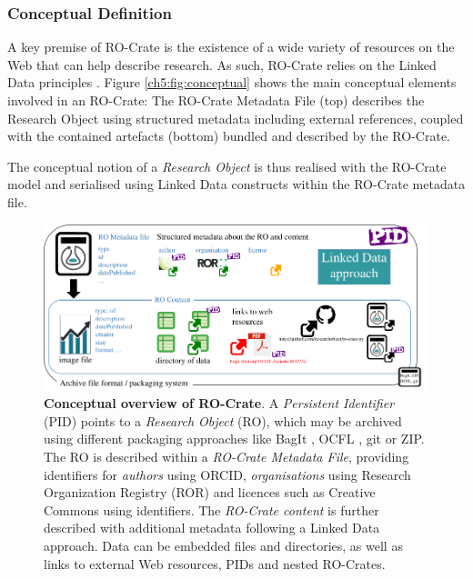 \subsubsection{Conceptual Definition}\label{ch5:conceptual}

A key premise of RO-Crate is the existence of a wide variety of
resources on the Web that can help describe research. As such, RO-Crate
relies on the Linked Data principles
\cite{Heath 2011}.
Figure \vref{ch5:fig:conceptual} shows the main conceptual
elements involved in an RO-Crate: The RO-Crate Metadata File (top)
describes the Research Object using structured metadata including
external references, coupled with the contained artefacts (bottom)
bundled and described by the RO-Crate.

The conceptual notion of a \emph{Research Object}
\cite{Bechhofer 2013}
is thus realised with the RO-Crate model and serialised using Linked
Data constructs within the RO-Crate metadata file.


\begin{figure}%
  \includegraphics[width=\textwidth]{figures/ch05/ro-crate-overview.pdf}
	\caption[Conceptual overview of RO-Crate]{\textbf{Conceptual overview of RO-Crate}. A \emph{Persistent
  Identifier} (\acrshort{PID}) \cite{McMurry 2017} points to a
  \emph{Research Object} (RO), which may be archived using different
  packaging approaches like BagIt \cite{Kunze 2018}, OCFL \cite
  {OCFL 2020}, git or \gls{ZIP}. The RO is described within a \emph{RO-Crate
  Metadata File}, providing identifiers for \emph{authors} using ORCID,
  \emph{organisations} using Research Organization Registry (ROR) 
  \cite{Lammey 2020} and licences such as Creative Commons using 
  identifiers. The \emph{RO-Crate content} is further described with
  additional metadata following a Linked Data approach. Data can be
  embedded files and directories, as well as links to external Web
  resources, PIDs and nested RO-Crates.}
  \label{ch5:fig:conceptual}
\end{figure}

